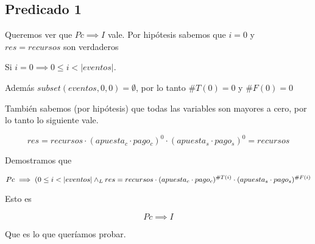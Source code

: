 \documentclass[../document.tex]{subfiles}
\begin{document}
\subsection*{Predicado 1}
Queremos ver que $Pc\implies I$ vale. Por hipótesis sabemos que $i=0$ y $res=recursos$ son verdaderos

Si $i=0 \implies 0\leq i < |eventos|$. 

Además $subset(eventos,0,0)=\emptyset$, por lo tanto $\#T(0)=0$ y $\#F(0)=0$

También sabemos (por hipótesis) que todas las variables son mayores a cero, por lo tanto lo siguiente vale.

\begin{equation*}
res=recursos\cdot(apuesta_c\cdot pago_c)^0\cdot (apuesta_s\cdot pago_s)^0=recursos
\end{equation*}

Demostramos que

\begin{equation}
Pc\implies (0\leq i < |eventos| \land _L res=recursos\cdot(apuesta_c\cdot pago_c)^{\#T(i)}\cdot (apuesta_s\cdot pago_s)^{\#F(i)}
\end{equation}

Esto es

\begin{equation*}
Pc\implies I
\end{equation*}

Que es lo que queríamos probar.








\end{document}

